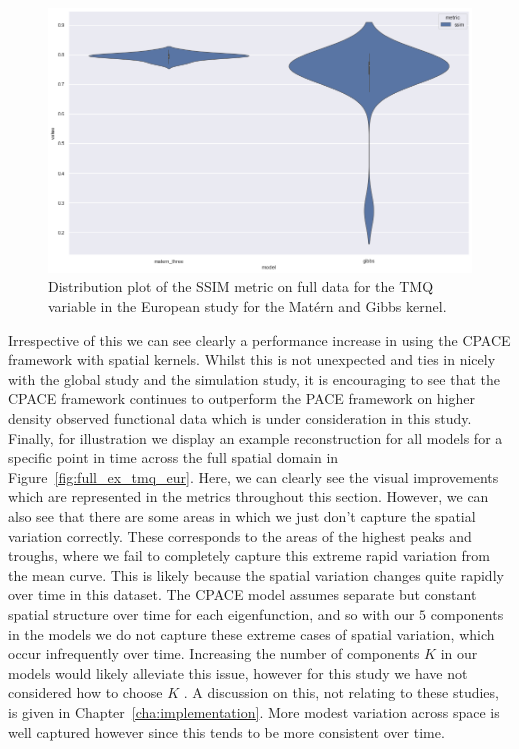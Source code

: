 \begin{figure}
	\centering
	\includegraphics[width=\textwidth]{full_tmq_eur_dist}
	\caption{Distribution plot of the SSIM metric on full data for the TMQ variable in the European study for the Mat\'ern and Gibbs kernel.}
	\label{fig:full_tmq_eur_dist}
\end{figure}

Irrespective of this we can see clearly a performance increase in using the CPACE framework with spatial kernels.
Whilst this is not unexpected and ties in nicely with the global study and the simulation study, it is encouraging to see that the CPACE framework continues to outperform the PACE framework on  higher density observed functional data which is under consideration in this study.
Finally, for illustration we display an example reconstruction for all models for a specific point in time across the full spatial domain in Figure~\ref{fig:full_ex_tmq_eur}.
Here, we can clearly see the visual  improvements which are represented in the metrics throughout this section.
However, we can also see that there are some areas in which we just don't capture the spatial variation correctly.
These corresponds to the areas of the highest peaks  and troughs, where we fail to completely capture this extreme rapid variation from the mean curve.
This is likely because the spatial variation changes quite rapidly over time in this dataset.
The CPACE model assumes separate but constant spatial structure over time for each eigenfunction, and so with our $5$ components in the models we do not capture these extreme cases of spatial variation, which occur infrequently over time.
Increasing the number of components $K$ in our models would likely alleviate this issue, however for this study we have not considered how to choose $K$ .
A discussion on this, not relating to these studies, is given in Chapter~\ref{cha:implementation}.
More modest variation across space is well captured however since this tends to be more consistent over time.

